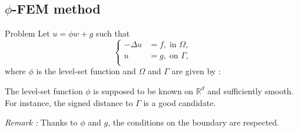 
\subsection{$\phi$-FEM method}

\begin{frame}{Problem}
    Let $u=\phi w+g$ such that
    $$\left\{\begin{aligned}
        -\Delta u &= f, \; \text{in } \Omega, \\
        u&=g, \; \text{on } \Gamma, \\
    \end{aligned}\right.$$
    where $\phi$ is the level-set function and $\Omega$ and $\Gamma$ are given by :
    \begin{center}
    \end{center}
    The level-set function $\phi$ is supposed to be known on $\mathbb{R}^d$ and sufficiently smooth. \\
    For instance, the signed distance to $\Gamma$ is a good candidate.

    \vspace{5pt}

    \footnotesize
    \textit{Remark :} Thanks to $\phi$ and $g$, the conditions on the boundary are respected.
\end{frame}

